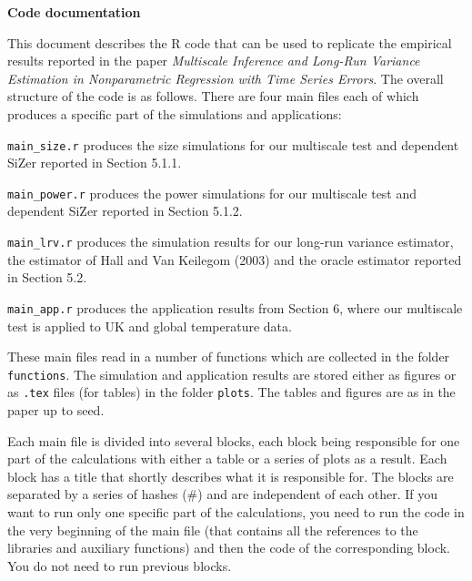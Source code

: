 \documentclass[a4paper,12pt]{article}
\begin{document}
\begin{center}
{\LARGE \bf Code documentation}
\end{center}
\vspace{0.5cm}


\setlength{\parskip}{0.2cm} 
This document describes the R code that can be used to replicate the empirical results reported in the paper \textit{Multiscale Inference and Long-Run Variance Estimation in Nonparametric Regression with Time Series Errors}. The overall structure of the code is as follows. There are four main files each of which produces a specific part of the simulations and applications:
\vspace{0.2cm}

\everypar{\hangafter=1\hangindent=1.45cm\relax}
\verb|main_size.r| \hspace{1pt} produces the size simulations for our multiscale test and dependent SiZer reported in Section 5.1.1.

\verb|main_power.r| \hspace{1pt} produces the power simulations for our multiscale test and dependent SiZer reported in Section 5.1.2.

\verb|main_lrv.r| \hspace{1pt} produces the simulation results for our long-run variance estimator, the estimator of Hall and Van Keilegom (2003) and the oracle estimator reported in Section 5.2.

\verb|main_app.r| \hspace{1pt} produces the application results from Section 6, where our multiscale test is applied to UK and global temperature data.


\everypar{\hangafter=0\relax}
These main files read in a number of functions which are collected in the folder \verb|functions|. The simulation and application results are stored either as figures or as \verb|.tex| files (for tables) in the folder \verb|plots|. The tables and figures are as in the paper up to seed.
\vspace{0.2cm}

Each main file is divided into several blocks, each block being responsible for one part of the calculations with either a table or a series of plots as a result. Each block has a title that shortly describes what it is responsible for. The blocks are separated by a series of hashes ($\#$) and are independent of each other. If you want to run only one specific part of the calculations, you need to run the code in the very beginning of the main file (that contains all the references to the libraries and auxiliary functions) and then the code of the corresponding block. You do not need to run previous blocks.
\vspace{0.2cm}
\end{document}
